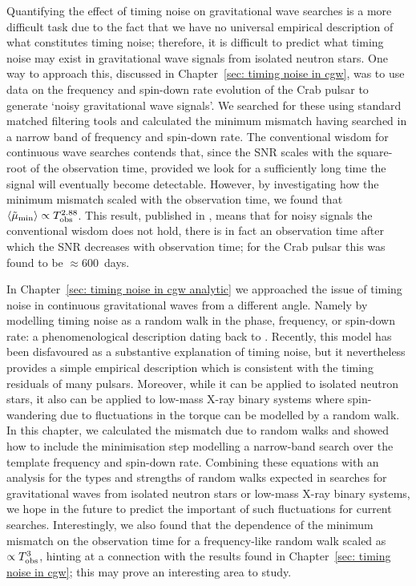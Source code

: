 \documentclass[twoside, 11pt]{thesis}
\begin{document}
Quantifying the effect of timing noise on gravitational wave searches is a more
difficult task due to the fact that we have no universal empirical description
of what constitutes timing noise; therefore, it is difficult to predict what
timing noise may exist in gravitational wave signals from isolated neutron stars.
One way to approach this, discussed in Chapter~\ref{sec: timing noise in cgw},
was to use data on the frequency and spin-down
rate evolution of the Crab pulsar to generate `noisy gravitational wave signals'.
We searched for these using standard matched filtering tools and calculated
the minimum mismatch having searched in a narrow band of frequency and spin-down
rate. The conventional wisdom for continuous wave searches contends that, since
the SNR scales with the square-root of the observation time, provided we look
for a sufficiently long time the signal will eventually become detectable.
However, by investigating how the minimum mismatch scaled with the observation
time, we found that $\langle \tilde{\mu}_{\textrm{min}} \rangle \propto T_{\mathrm{obs}}^{2.88}$.
This result, published in \citet{Ashton2015}, means that for noisy signals the
conventional wisdom does not hold, there is in fact an observation time after
which the SNR decreases with observation time; for the Crab pulsar this was
found to be $ \approx 600$~days.

In Chapter~\ref{sec: timing noise in cgw analytic} we approached the issue of
timing noise in continuous gravitational waves from a different angle. Namely
by modelling timing noise as a random walk in the phase, frequency, or
spin-down rate: a phenomenological description dating back to
\citet{Boynton1972}. Recently, this model has been disfavoured
\citep{Hobbs2010} as a substantive explanation of timing noise, but it
nevertheless provides a simple empirical description which is consistent with
the timing residuals of many pulsars. Moreover, while it can be applied to
isolated neutron stars, it also can be applied to low-mass X-ray binary systems
where spin-wandering due to fluctuations in the torque can be modelled by a
random walk. In this chapter, we calculated the mismatch due to random walks and
showed how to include the minimisation step modelling a narrow-band search over
the template frequency and spin-down rate. Combining these equations with an analysis for the
types and strengths of random walks expected in searches for gravitational
waves from isolated neutron stars or low-mass X-ray binary systems, we hope in
the future to predict the important of such fluctuations for current searches.
Interestingly, we also found that the dependence of the minimum mismatch on
the observation time for a frequency-like random walk scaled as $\propto T_{\mathrm{obs}}^{3}$,
hinting at a connection with the results found in Chapter~\ref{sec: timing noise in cgw};
this may prove an interesting area to study.
\end{document}
